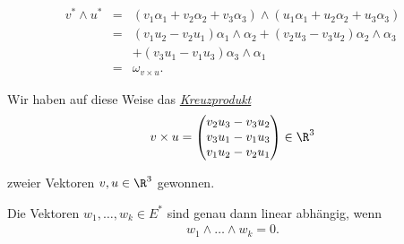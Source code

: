 \begin{example}{}{}
\begin{itemize}
\end{itemize}
\begin{align*}
v^*\wedge u^* &=& (v_1\alpha_1+v_2\alpha_2+v_3\alpha_3)
\wedge(u_1\alpha_1+u_2\alpha_2+u_3\alpha_3)\\
&=& (v_1u_2-v_2u_1)\alpha_1\wedge\alpha_2+(v_2u_3-v_3u_2)\alpha_2\wedge
\alpha_3\\
&& + (v_3u_1-v_1u_3)\alpha_3\wedge\alpha_1\\
&=& \omega_{v\times u}.
\end{align*}
\par
Wir haben auf diese Weise das \href{https://de.wikipedia.org/wiki/Kreuzprodukt}{\emph{Kreuzprodukt}}
\begin{align*}
v\times u=\begin{pmatrix} v_2u_3-v_3u_2\\v_3u_1-v_1u_3 \\ v_1u_2-v_2u_1 \end{pmatrix} \in\R^3
\end{align*}
\par
zweier Vektoren \(v,u\in\R^3\) gewonnen.
\end{example}
\label{vektoranalysis/multilinear:theorem-20}
\begin{theorem}{}{}



\par
Die Vektoren \(w_1,\ldots,w_k\in E^*\) sind genau dann linear abhängig, wenn
\begin{align*}
w_1\wedge\ldots\wedge w_k=0.
\end{align*}\end{theorem}

